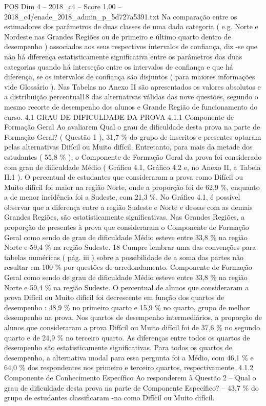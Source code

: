 \begin{textsample}{POS Dim 4 – 2018\_c4 – Score 1.00 – 2018\_c4/enade\_2018\_admin\_p\_5d727a5391.txt}
Na comparação entre os estimadores dos parâmetros de duas classes de uma dada categoria ( e.g.
Norte e Nordeste nas Grandes Regiões ou de primeiro e último quarto dentro de desempenho ) associados aos seus respectivos intervalos de confiança, diz -se que não há diferença estatisticamente significativa entre os parâmetros das duas categorias quando há interseção entre os intervalos de confiança e que há diferença, se os intervalos de confiança são disjuntos ( para maiores informações vide Glossário ).
Nas Tabelas no Anexo II são apresentados os valores absolutos e a distribuição percentual18 das alternativas válidas das nove questões, segundo o mesmo recorte de desempenho dos alunos e Grande Região de funcionamento do curso. 4.1 GRAU DE DIFICULDADE DA PROVA 4.1.1 Componente de Formação Geral Ao avaliarem Qual o grau de dificuldade desta prova na parte de Formação Geral? ( Questão 1 ), 31,7 \% do grupo de inscritos e presentes optaram pelas alternativas Difícil ou Muito difícil.
Entretanto, para mais da metade dos estudantes ( 55,8 \% ), o Componente de Formação Geral da prova foi considerado com grau de dificuldade Médio ( Gráfico 4.1, Gráfico 4.2 e, no Anexo II, a Tabela II.1 ).
O percentual de estudantes que consideraram a prova como Difícil ou Muito difícil foi maior na região Norte, onde a proporção foi de 62,9 \%, enquanto a de menor incidência foi a Sudeste, com 21,3 \%.
No Gráfico 4.1, é possível observar que a diferença entre a região Sudeste e Norte e dessas com as demais Grandes Regiões, são estatisticamente significativas.
Nas Grandes Regiões, a proporção de presentes à prova que consideraram o Componente de Formação Geral como sendo de grau de dificuldade Médio esteve entre 33,8 \% na região Norte e 59,4 \% na região Sudeste. 18 Cumpre lembrar uma das convenções para tabelas numéricas ( pág. iii ) sobre a possibilidade de a soma das partes não resultar em 100 \% por questões de arredondamento.
Componente de Formação Geral como sendo de grau de dificuldade Médio esteve entre 33,8 \% na região Norte e 59,4 \% na região Sudeste.
O percentual de alunos que consideraram a prova Difícil ou Muito difícil foi decrescente em função dos quartos de desempenho : 48,9 \% no primeiro quarto e 15,9 \% no quarto, grupo de melhor desempenho na prova.
Nos quartos de desempenho intermediários, a proporção de alunos que consideraram a prova Difícil ou Muito difícil foi de 37,6 \% no segundo quarto e de 24,9 \% no terceiro quarto.
As diferenças entre todos os quartos de desempenho são estatisticamente significativas.
Para todos os quartos de desempenho, a alternativa modal para essa pergunta foi a Médio, com 46,1 \% e 64,0 \% dos respondentes nos primeiro e terceiro quartos, respectivamente. 4.1.2 Componente de Conhecimento Específico Ao responderem à Questão 2 – Qual o grau de dificuldade desta prova na parte de Componente Específico? – 43,7 \% do grupo de estudantes classificaram -na como Difícil ou Muito difícil.

\end{textsample}
